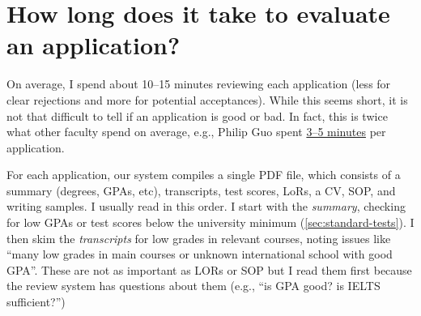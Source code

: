 \documentclass[oneside,11pt,dvipsnames]{book}
\def\sectioninfo#1{%
  \addcontentsline{toc}{sectioninfo}{%
    \noexpand\numberline{}\color{black}{#1}}%
}
\begin{document}






\section{How long does it take to evaluate an application?}\label{sec:ievaluate}
\sectioninfo{It takes me about 10--15 minutes to review an application.}

On average, I spend about 10--15 minutes reviewing each application (less for clear rejections and more for potential acceptances). While this seems short, it is not that difficult to tell if an application is good or bad.  In fact, this
is twice what other faculty spend on average, e.g., Philip Guo spent \href{https://pg.ucsd.edu/PhD-application-tips.htm}{3--5 minutes} per application.

For each application, our system compiles a single PDF file, which consists of a summary (degrees, GPAs, etc), transcripts, test scores, LoRs, a CV, SOP, and writing samples. I usually read in this order. I start with the \emph{summary}, checking for low GPAs or test scores below the university minimum (\autoref{sec:standard-tests}). I then skim the \emph{transcripts} for low grades in relevant courses, noting issues like ``many low grades in main courses or unknown international school with good GPA''.  These are not as important as LORs or SOP but I read them first because the review system has questions about them (e.g., ``is GPA good? is IELTS sufficient?'')
\end{document}

